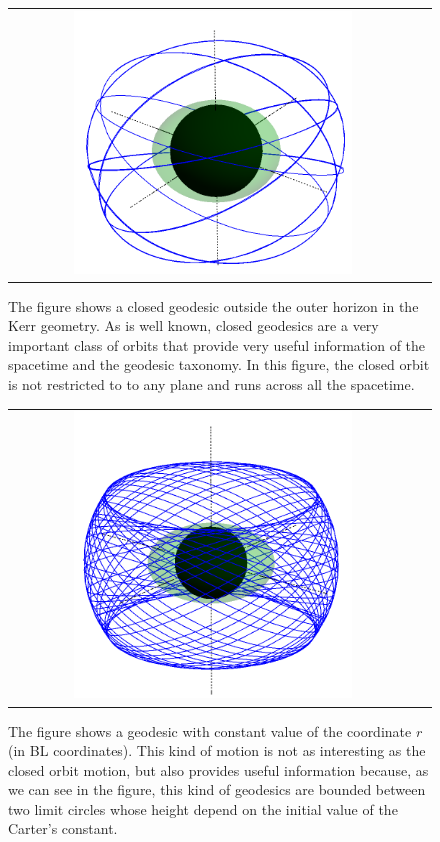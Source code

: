 \begin{figure}
\centering
 \hspace*{-0.05\textwidth}
\begin{tabular}{cc}
\centerline{\includegraphics[width=0.7\textwidth]{img/Chapter4/ClosedOrbit.png}}
\end{tabular}
\caption{The figure shows a closed geodesic outside the outer horizon in the Kerr geometry. As is well known, closed geodesics are a very important class of orbits that provide very useful information of the spacetime and the geodesic taxonomy. In this figure, the closed orbit is not restricted to to any plane and runs across all the spacetime. }
\end{figure}

\clearpage

\begin{figure}
\centering
 \hspace*{-0.05\textwidth}
\begin{tabular}{cc}
\centerline{\includegraphics[width=0.7\textwidth]{img/Chapter4/Constantradius.png}}
\end{tabular}
\caption{The figure shows a geodesic with constant value of the coordinate $r$ (in \gls{BL} coordinates). This kind of motion is not as interesting as the closed orbit motion, but also provides useful information because, as we can see in the figure, this kind of geodesics are bounded between two limit circles whose height depend on the initial value of the Carter's constant. }
\end{figure}

